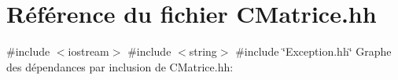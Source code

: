 \hypertarget{CMatrice_8hh}{}\section{Référence du fichier C\+Matrice.\+hh}
\label{CMatrice_8hh}
{\ttfamily \#include $<$iostream$>$}\newline
{\ttfamily \#include $<$string$>$}\newline
{\ttfamily \#include \char`\"{}Exception.\+hh\char`\"{}}\newline
Graphe des dépendances par inclusion de C\+Matrice.\+hh\+:
